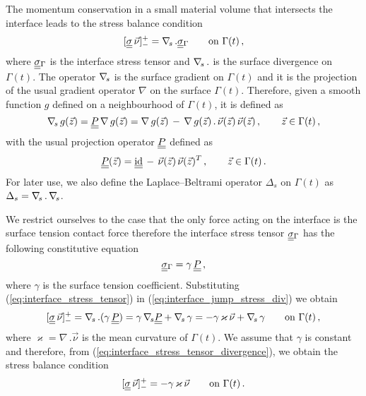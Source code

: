 The momentum conservation in a small material volume that intersects the
interface leads to the stress balance condition
\begin{equation}\label{eq:interface_jump_stress_div}
[\mat\sigma\,\vec \nu]_-^+ = \nabs\,.\mat\sigma_{\Gamma} \qquad \mbox{on }
\Gamma(t)\,,
\end{equation}
where $\mat\sigma_{\Gamma}$ is the interface stress tensor and $\nabla_{\!s}\,.$ is
the surface divergence on $\Gamma(t)$. The operator $\nabla_{\!s}$ is the surface
gradient on $\Gamma(t)$ and it is the projection of the usual gradient operator
$\nabla$ on the surface $\Gamma(t)$. Therefore, given a smooth function $g$
defined on a neighbourhood of $\Gamma(t)$, it is defined as
\begin{equation}\label{eq:surface_gradient}
\nabs\,g(\vec z)=\mat P\,\nabla\,g(\vec z)=\nabla\,g(\vec z)\,-
\,\nabla\,g(\vec z)\,.\,\vec\nu(\vec z)\,\vec\nu(\vec z)\,,\qquad \vec z
\in\Gamma(t)\,,
\end{equation}
with the usual projection operator $\mat P$ defined as
\begin{equation}\label{eq:surface_projection}
\mat P(\vec z)=\mat\id\,-\,\vec\nu(\vec z)\,\vec\nu(\vec z)^T\,,\qquad \vec
z\in \Gamma(t)\,.
\end{equation}
For later use, we also define the Laplace--Beltrami operator $\Delta_s$ on
$\Gamma(t)$ as $\Delta_s = \nabla_{\!s}\,.\,\nabla_{\!s}$.

We restrict ourselves to the case that the only force acting on the interface
is the surface tension contact force therefore the interface stress tensor
$\mat\sigma_\Gamma$ has the following constitutive equation
\begin{equation}\label{eq:interface_stress_tensor}
\mat\sigma_{\Gamma}=\gamma\,\mat P\,,
\end{equation}
where $\gamma$ is the surface tension coefficient. Substituting
(\ref{eq:interface_stress_tensor}) in (\ref{eq:interface_jump_stress_div}) we
obtain
\begin{equation}\label{eq:interface_stress_tensor_divergence}
[\mat\sigma\,\vec \nu]_-^+ = \nabs\,.(\gamma\,\mat P)=\gamma\,\nabs\mat
P+\nabs\,\gamma=-\gamma\,\varkappa\,\vec\nu + \nabs\,\gamma \qquad \mbox{on }
\Gamma(t)\,,
\end{equation}
where $\varkappa = \nabla\,.\vec\nu$ is the mean curvature of $\Gamma(t)$. We
assume that $\gamma$ is constant and therefore, from
(\ref{eq:interface_stress_tensor_divergence}), we obtain the stress balance
condition
\begin{equation}\label{eq:interface_jump_stress}
[\mat\sigma\,\vec \nu]_-^+ = -\gamma\,\varkappa\,\vec\nu \qquad \mbox{on }
\Gamma(t)\,.
\end{equation}

